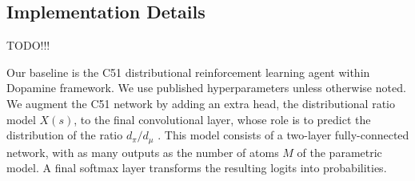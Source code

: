 \documentclass[12pt,a4paper,openright,twoside]{article}
\numberwithin{equation}{section}
\theoremstyle{definition}
\theoremstyle{remark}
\theoremstyle{plain}
\begin{document}
\subsection{Implementation Details}

TODO!!!

Our baseline is the C51 distributional reinforcement learning agent\cite{DRL} within Dopamine framework\cite{dopamine}. We use published hyperparameters unless otherwise noted. We augment the C51 network by adding an extra head, the distributional ratio model $X(s)$, to the final convolutional layer, whose role is to predict the distribution of the ratio $d_\pi / d_\mu$ . This model consists of a two-layer fully-connected network, with as many outputs as the number of atoms $M$ of the parametric model. A final softmax layer transforms the resulting logits into probabilities. 

\newpage
\end{document}
